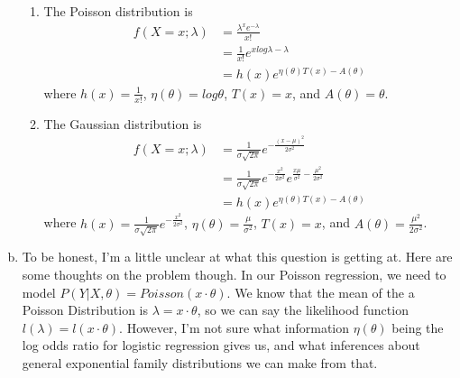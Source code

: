 \documentclass[letterpaper,11pt]{article}
\begin{document}
\begin{enumerate}[(a)]
\begin{enumerate}[(1)]
\item
  The Poisson distribution is
  \begin{align}
  f(X=x;\lambda) & = \frac{\lambda^x e^{-\lambda}}{x!}\\
                 & = \frac{1}{x!} e^{x log \lambda - \lambda}\\
                 & = h(x) e^{\eta(\theta) T(x) - A(\theta)}
  \end{align}
 where $h(x) = \frac{1}{x!}$, $\eta(\theta) = log \theta$, $T(x) = x$, and $A(\theta) = \theta$.
\item
  The Gaussian distribution is
  \begin{align}
  f(X=x;\lambda) & = \frac{1}{\sigma \sqrt{2 \pi}} e^{-\frac{(x-\mu)^2}{2\sigma^2}}\\
                 & = \frac{1}{\sigma \sqrt{2 \pi}} e^{-\frac{x^2}{2\sigma^2}} e^{\frac{x \mu}{\sigma^2} - \frac{\mu^2}{2 \sigma^2}}\\
                 & = h(x) e^{\eta(\theta) T(x) - A(\theta)}
  \end{align}
 where $h(x) = \frac{1}{\sigma \sqrt{2 \pi}} e^{-\frac{x^2}{2\sigma^2}}$, $\eta(\theta) = \frac{\mu}{\sigma^2}$, $T(x) = x$, and $A(\theta) = \frac{\mu^2}{2 \sigma^2}$.
\end{enumerate}
\item
    To be honest, I'm a little unclear at what this question is getting at.
    Here are some thoughts on the problem though. In our Poisson regression,
    we need to model $P(Y | X, \theta) = Poisson(x \cdot \theta)$. We know that
    the mean of the a Poisson Distribution is $\lambda = x \cdot \theta$, so we
    can say the likelihood function $l(\lambda) = l(x \cdot \theta)$. However, I'm
    not sure what information $\eta(\theta)$ being the log odds ratio for logistic
    regression gives us, and what inferences about general exponential family distributions
    we can make from that.


\end{enumerate}
\end{document}
